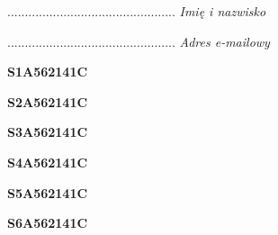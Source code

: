 \begin{turn}{90}\begin{minipage}{\linewidth} \vspace{20mm} ................................................  \textit{Imię i nazwisko}\end{minipage}\end{turn}

\begin{turn}{90}\begin{minipage}{\linewidth} \vspace{20mm} ................................................  \textit{Adres e-mailowy}\end{minipage}\end{turn}

\begin{turn}{90}\huge \begin{minipage}{\linewidth} \vspace{10mm}\textbf{S1A562141C}\end{minipage}\end{turn}

\begin{turn}{90}\huge \begin{minipage}{\linewidth} \vspace{10mm}\textbf{S2A562141C}\end{minipage}\end{turn}

\begin{turn}{90}\huge \begin{minipage}{\linewidth} \vspace{10mm}\textbf{S3A562141C}\end{minipage}\end{turn}

\begin{turn}{90}\huge \begin{minipage}{\linewidth} \vspace{10mm}\textbf{S4A562141C}\end{minipage}\end{turn}

\begin{turn}{90}\huge \begin{minipage}{\linewidth} \vspace{10mm}\textbf{S5A562141C}\end{minipage}\end{turn}

\begin{turn}{90}\huge \begin{minipage}{\linewidth} \vspace{10mm}\textbf{S6A562141C}\end{minipage}\end{turn}

